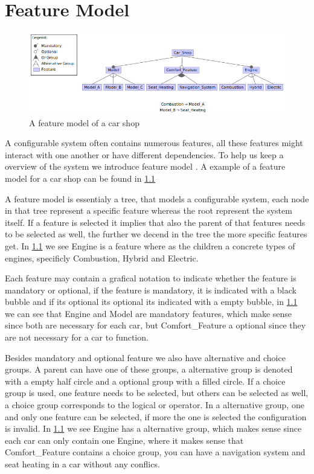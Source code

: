 \chapter{Feature Model}\label{ch:Feature Model}

\begin{figure}[h]
    \centering
    \includegraphics[scale=0.6]{gfx/Car_Shop.png}
    \caption{A feature model of a car shop}
    \label{fig:car}
\end{figure}

A configurable system often contains numerous features, all these features might interact with one another or have different dependencies.
To help us keep a overview of the system we introduce feature model \cite{Feature-Oriented-Software-Product-Lines-Feature-models}. A example
of a feature model for a car shop can be found in \ref{fig:car}

A feature model is essentialy a tree, that models a configurable system, each node in that tree represent a specific feature whereas the root
represent the system itself. If a feature is selected it implies that also the parent of that features needs to be selected as well, the further
we decend in the tree the more specific features get. In \ref{fig:car} we see Engine is a feature where as the children a concrete types
of engines, specificly Combustion, Hybrid and Electric.

Each feature may contain a grafical notation to indicate whether the feature is mandatory or optional, if the feature is mandatory, it is 
indicated with a black bubble and if its optional its optional its indicated with a empty bubble, in \ref{fig:car} we can see that Engine and
Model are mandatory features, which make sense since both are necessary for each car, but Comfort\_Feature a optional since they are not
necessary for a car to function.

Besides mandatory and optional feature we also have alternative and choice groups. A parent can have one of these groups, a alternative group
is denoted with a empty half circle and a optional group with a filled circle. If a choice group is used, one feature needs to be selected, but
others can be selected as well, a choice group corresponds to the logical or operator. In a alternative group, one and only one feature can be
selected, if more the one is selected the configuration is invalid. In \ref{fig:car} we see Engine has a alternative group, which makes sense
since each car can only contain one Engine, where it makes sense that Comfort\_Feature contains a choice group, you can have a navigation system
and seat heating in a car without any conflics.

